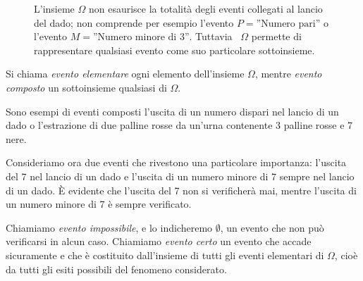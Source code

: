 \begin{inaccessibleblock}
 \begin{figure}[htpb]
\begin{minipage}[c]{.55\textwidth}
L'insieme \(\Omega \) non esaurisce la totalità degli eventi collegati al lancio 
del dado; non comprende per esempio l'evento \(P=\text{''Numero pari''}\) o 
l'evento \(M=\text{''Numero minore di 3''}\). Tuttavia~ \(\Omega \) permette di 
rappresentare qualsiasi 
evento come suo particolare sottoinsieme.
\end{minipage}\hfil
\begin{minipage}[c]{.35\textwidth}
\end{minipage}
\end{figure}
\end{inaccessibleblock}

\begin{definizione}
Si chiama \emph{evento elementare} ogni elemento dell'insieme \(\Omega\), mentre 
\emph{evento composto} un sottoinsieme qualsiasi di \(\Omega\).
\end{definizione}

Sono esempi di eventi composti l'uscita di un numero dispari nel lancio di un 
dado o l'estrazione di due palline rosse da un'urna contenente 3 palline rosse 
e 
7 nere.

Consideriamo ora due eventi che rivestono una particolare importanza: l'uscita 
del 7 nel lancio di un dado e l'uscita di un numero minore di 7 sempre nel 
lancio di un dado. È evidente che l'uscita del 7 non si verificherà mai, mentre 
l'uscita di un numero minore di 7 è sempre verificato.

\begin{definizione}
Chiamiamo \emph{evento impossibile}, e lo indicheremo \(\emptyset \), un evento 
che non può verificarsi in alcun caso.
Chiamiamo \emph{evento certo} un evento che accade sicuramente e che è 
costituito dall'insieme di tutti gli eventi elementari di \(\Omega \), cioè da 
tutti gli esiti possibili del fenomeno considerato.
\end{definizione}

